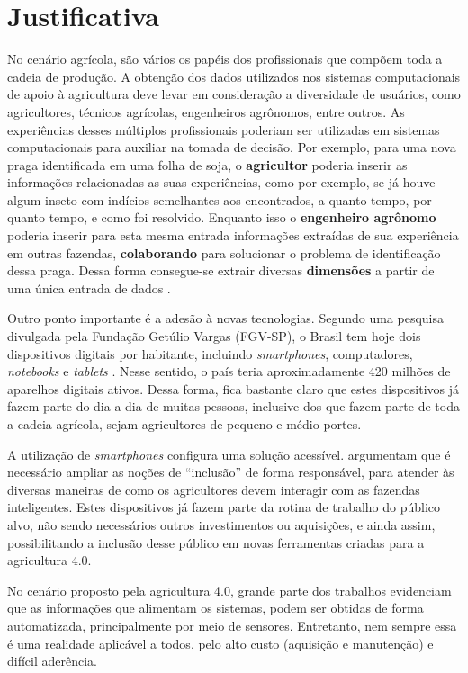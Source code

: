 \documentclass[12pt]{article}
\begin{document}
\section{Justificativa}
\label{sec:justificativa}

No cenário agrícola, são vários os papéis dos profissionais que compõem toda a cadeia de produção. A obtenção dos dados utilizados nos sistemas computacionais de apoio à agricultura deve levar em consideração a diversidade de usuários, como agricultores, técnicos agrícolas, engenheiros agrônomos, entre outros. As experiências desses múltiplos profissionais poderiam ser utilizadas em sistemas computacionais para auxiliar na tomada de decisão. Por exemplo, para uma nova praga identificada em uma folha de soja, o \textbf{agricultor} poderia inserir as informações relacionadas as suas experiências, como por exemplo, se já houve algum inseto com indícios semelhantes aos encontrados, a quanto tempo, por quanto tempo, e como foi resolvido. Enquanto isso o \textbf{engenheiro agrônomo} poderia inserir para esta mesma entrada informações extraídas de sua experiência em outras fazendas, \textbf{colaborando} para solucionar o problema de identificação dessa praga. Dessa forma consegue-se extrair diversas \textbf{dimensões} a partir de uma única entrada de dados \cite{Walling:2020}.

Outro ponto importante é a adesão à novas tecnologias. Segundo uma pesquisa divulgada pela Fundação Getúlio Vargas (FGV-SP), o Brasil tem hoje dois dispositivos digitais por habitante, incluindo \textit{smartphones}, computadores, \textit{notebooks} e \textit{tablets} \cite{FGV:2020}. Nesse sentido, o país teria aproximadamente 420 milhões de aparelhos digitais ativos. Dessa forma, fica bastante claro que estes dispositivos já fazem parte do dia a dia de muitas pessoas, inclusive dos que fazem parte de toda a cadeia agrícola, sejam agricultores de pequeno e médio portes.

A utilização de \textit{smartphones} configura uma solução acessível.  argumentam que é necessário ampliar as noções de ``inclusão'' de forma responsável, para atender às diversas maneiras de como os agricultores devem interagir com as fazendas inteligentes. Estes dispositivos já fazem parte da rotina de trabalho do público alvo, não sendo necessários outros investimentos ou aquisições, e ainda assim, possibilitando a inclusão desse público em novas ferramentas criadas para a agricultura 4.0.

No cenário proposto pela agricultura 4.0, grande parte dos trabalhos evidenciam que as informações que alimentam os sistemas, podem ser obtidas de forma automatizada, principalmente por meio de sensores. Entretanto, nem sempre essa é uma realidade aplicável a todos, pelo alto custo (aquisição e manutenção) e difícil aderência.
\end{document}
